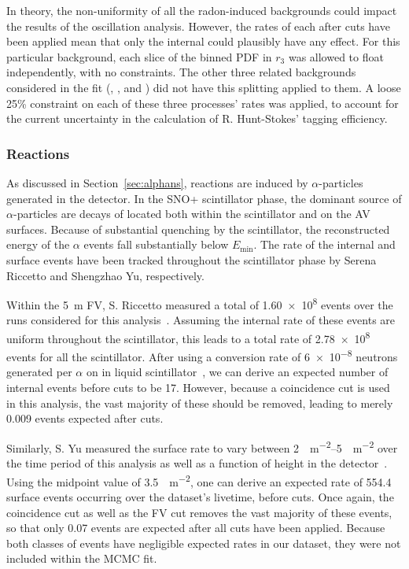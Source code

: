 In theory, the non-uniformity of all the radon-induced backgrounds could impact the results of the oscillation analysis. However, the rates of each after cuts have been applied mean that only the internal  could plausibly have any effect. For this particular background, each slice of the binned PDF in $r_{3}$ was allowed to float independently, with no constraints. The other three related backgrounds considered in the fit (, , and ) did not have this splitting applied to them. A loose 25\% constraint on each of these three processes' rates was applied, to account for the current uncertainty in the calculation of R. Hunt-Stokes' tagging efficiency.

\subsubsection{\alphan{} Reactions}
As discussed in Section~\ref{sec:alphans}, \alphan{} reactions are induced by $\alpha$-particles generated in the detector. In the SNO+ scintillator phase, the dominant source of $\alpha$-particles are decays of  located both within the scintillator and on the AV surfaces. Because of substantial quenching by the scintillator, the reconstructed energy of the  $\alpha$ events fall substantially below $E_{\textrm{min}}$. The rate of the internal and surface  events have been tracked throughout the scintillator phase by Serena Riccetto and Shengzhao Yu, respectively.

Within the \SI{5}{\m} FV, S. Riccetto measured a total of \num{1.60e8}  events over the runs considered for this analysis~\cite{riccettoPrivateCommunication2023,riccettoFullFillInternal2023}. %
Assuming the internal rate of these events are uniform throughout the scintillator, this leads to a total rate of \num{2.78e8} events for all the scintillator. After using a conversion rate of \num{6e-8} neutrons generated per $\alpha$ on  in liquid scintillator~\cite{morton-blakeFirstMeasurementReactor2021,lozzaNeutronSourcesBackgrounds2015}, %
we can derive an expected number of internal \alphan{} events before cuts to be 17. However, because a coincidence cut is used in this analysis, the vast majority of these should be removed, leading to merely 0.009 events expected after cuts.

Similarly, S. Yu measured the surface  rate to vary between \SIrange{2}{5}{\Bq\per\square\metre} over the time period of this analysis as well as a function of height in the detector~\cite{yuAVSurfacePo2102023}. %
Using the midpoint value of \SI{3.5}{\Bq\per\square\metre}, one can derive an expected rate of 554.4 surface \alphan{} events occurring over the dataset's livetime, before cuts. Once again, the coincidence cut as well as the FV cut removes the vast majority of these events, so that only 0.07 events are expected after all cuts have been applied. Because both classes of \alphan{} events have negligible expected rates in our dataset, they were not included within the MCMC fit.

